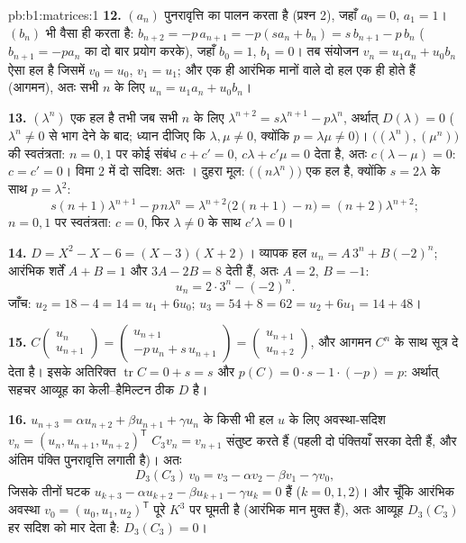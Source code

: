 \begin{solution}{pb:b1:matrices:1}
\textbf{12.} $(a_n)$ पुनरावृत्ति का पालन करता है (प्रश्न 2), जहाँ $a_0 = 0$,
$a_1 = 1$। $(b_n)$ भी वैसा ही करता है: $b_{n+2} = -p\,a_{n+1} = -p(s a_n +
b_n) = s\,b_{n+1} - p\,b_n$ ($b_{n+1} = -pa_n$ का दो बार प्रयोग करके), जहाँ
$b_0 = 1$, $b_1 = 0$। तब संयोजन $v_n = u_1 a_n + u_0 b_n$ ऐसा हल है जिसमें
$v_0 = u_0$, $v_1 = u_1$; और एक ही आरंभिक मानों वाले दो हल एक ही होते हैं
(आगमन), अतः सभी $n$ के लिए $u_n = u_1 a_n + u_0 b_n$।

\textbf{13.} $(\lambda^n)$ एक हल है तभी जब सभी $n$ के लिए $\lambda^{n+2} =
s\lambda^{n+1} - p\lambda^n$, अर्थात् $D(\lambda) = 0$ ($\lambda^n \neq 0$
से भाग देने के बाद; ध्यान दीजिए कि $\lambda, \mu \neq 0$, क्योंकि $p =
\lambda\mu \neq 0$)। $\bigl((\lambda^n), (\mu^n)\bigr)$ की स्वतंत्रता: $n =
0, 1$ पर कोई संबंध $c + c' = 0$, $c\lambda + c'\mu = 0$ देता है, अतः
$c(\lambda - \mu) = 0$: $c = c' = 0$। विमा $2$ में दो  सदिश: अतः
। दुहरा मूल: $\bigl((n\lambda^n)\bigr)$ एक हल है, क्योंकि $s = 2\lambda$
के साथ $p = \lambda^2$:
\[
s(n+1)\lambda^{n+1} - p\,n\lambda^n
= \lambda^{n+2}\bigl(2(n+1) - n\bigr) = (n+2)\lambda^{n+2} ;
\]
$n = 0, 1$ पर स्वतंत्रता: $c = 0$, फिर $\lambda \neq 0$ के साथ $c'\lambda =
0$।

\textbf{14.} $D = X^2 - X - 6 = (X - 3)(X + 2)$। व्यापक हल $u_n = A\,3^n +
B(-2)^n$; आरंभिक शर्तें $A + B = 1$ और $3A - 2B = 8$ देती हैं, अतः $A = 2$,
$B = -1$:
\[
u_n = 2\cdot 3^n - (-2)^n .
\]
जाँच: $u_2 = 18 - 4 = 14 = u_1 + 6u_0$; $u_3 = 54 + 8 = 62 = u_2 + 6u_1 = 14
+ 48$।

\textbf{15.} $C\begin{pmatrix} u_n\\ u_{n+1}\end{pmatrix} = \begin{pmatrix}
u_{n+1}\\ -p\,u_n + s\,u_{n+1}\end{pmatrix} = \begin{pmatrix} u_{n+1}\\
u_{n+2}\end{pmatrix}$, और आगमन $C^n$ के साथ सूत्र दे देता है। इसके अतिरिक्त
$\operatorname{tr} C = 0 + s = s$ और $p(C) = 0\cdot s - 1\cdot(-p) = p$:
अर्थात् सहचर आव्यूह का केली--हैमिल्टन  ठीक $D$ है।

\textbf{16.} $u_{n+3} = \alpha u_{n+2} + \beta u_{n+1} + \gamma u_n$ के किसी
भी हल $u$ के लिए अवस्था-सदिश $v_n = (u_n, u_{n+1}, u_{n+2})^{\mathsf T}$
$C_3 v_n = v_{n+1}$ संतुष्ट करते हैं (पहली दो पंक्तियाँ सरका देती हैं, और
अंतिम पंक्ति पुनरावृत्ति लगाती है)। अतः
\[
D_3(C_3)\,v_0 = v_3 - \alpha v_2 - \beta v_1 - \gamma v_0 ,
\]
जिसके तीनों घटक $u_{k+3} - \alpha u_{k+2} - \beta u_{k+1} - \gamma u_k = 0$
हैं ($k = 0, 1, 2$)। और चूँकि आरंभिक अवस्था $v_0 = (u_0, u_1, u_2)^{\mathsf
T}$ पूरे $K^3$ पर घूमती है (आरंभिक मान मुक्त हैं), अतः आव्यूह $D_3(C_3)$ हर
सदिश को मार देता है: $D_3(C_3) = 0$।


\end{solution}
